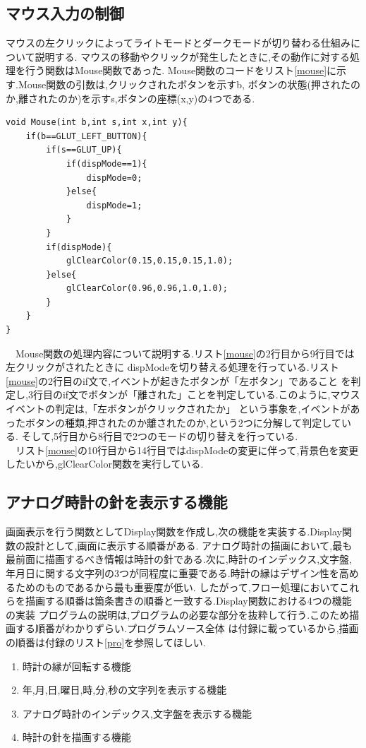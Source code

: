 \documentclass[a4j]{jarticle}
\begin{document}
    \subsection{マウス入力の制御}
    マウスの左クリックによってライトモードとダークモードが切り替わる仕組みについて説明する.
    マウスの移動やクリックが発生したときに,その動作に対する処理を行う関数はMouse関数であった.
    Mouse関数のコードをリスト\ref{mouse}に示す.Mouse関数の引数は,クリックされたボタンを示すb,
    ボタンの状態(押されたのか,離されたのか)を示すs,ボタンの座標(x,y)の4つである.
    \begin{lstlisting}[basicstyle=\ttfamily\footnotesize, frame=single,label=mouse,caption=Mouse関数]
void Mouse(int b,int s,int x,int y){
    if(b==GLUT_LEFT_BUTTON){
        if(s==GLUT_UP){
            if(dispMode==1){
                dispMode=0;
            }else{
                dispMode=1;
            }
        }
        if(dispMode){
            glClearColor(0.15,0.15,0.15,1.0);
        }else{
            glClearColor(0.96,0.96,1.0,1.0);
        }
    }
}
            \end{lstlisting}
      　Mouse関数の処理内容について説明する.リスト\ref{mouse}の2行目から9行目では左クリックがされたときに
      dispModeを切り替える処理を行っている.リスト\ref{mouse}の2行目のif文で,イベントが起きたボタンが「左ボタン」であること
      を判定し,3行目のif文でボタンが「離された」ことを判定している.このように,マウスイベントの判定は,「左ボタンがクリックされたか」
      という事象を,イベントがあったボタンの種類,押されたのか離されたのか,という2つに分解して判定している.
      そして,5行目から8行目で2つのモードの切り替えを行っている.\\
      　リスト\ref{mouse}の10行目から14行目ではdispModeの変更に伴って,背景色を変更したいから,glClearColor関数を実行している.

    \subsection{アナログ時計の針を表示する機能}
    画面表示を行う関数としてDisplay関数を作成し,次の機能を実装する.Display関数の設計として,画面に表示する順番がある.
    アナログ時計の描画において,最も最前面に描画するべき情報は時計の針である.次に,時計のインデックス,文字盤,
    年月日に関する文字列の3つが同程度に重要である.時計の縁はデザイン性を高めるためのものであるから最も重要度が低い.
    したがって,フロー処理においてこれらを描画する順番は箇条書きの順番と一致する.Display関数における4つの機能の実装
    プログラムの説明は,プログラムの必要な部分を抜粋して行う.このため描画する順番がわかりずらい.プログラムソース全体
    は付録に載っているから,描画の順番は付録のリスト\ref{pro}を参照してほしい.
    \begin{enumerate}
      \item 時計の縁が回転する機能 
      \item 年,月,日,曜日,時,分,秒の文字列を表示する機能
      \item アナログ時計のインデックス,文字盤を表示する機能
      \item 時計の針を描画する機能 
    \end{enumerate}
\end{document}
